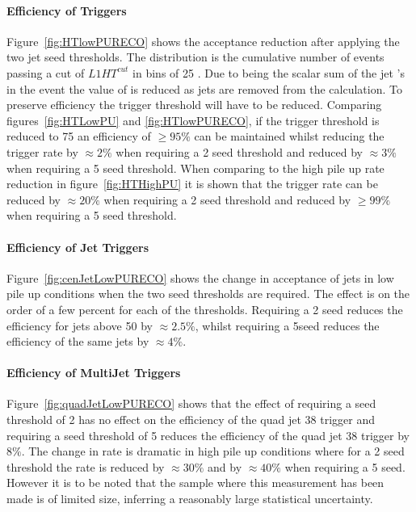 \paragraph{Efficiency of \HT Triggers} %
\label{par:Efficneicy of HT triggers}
Figure~\ref{fig:HTlowPURECO} shows the acceptance reduction after applying the 
two jet seed thresholds. The distribution is the cumulative number of events 
passing a cut of $L1 HT^{cut}$ in bins of 25 \GeV. Due to \HT being the scalar 
sum of the jet \PT's in the event the value of \Lone \HT is reduced as jets are 
removed from the calculation. To preserve efficiency the \Lone trigger 
threshold will have to be reduced. Comparing figures~\ref{fig:HTLowPU} and 
\ref{fig:HTlowPURECO}, if the trigger threshold is reduced to 75 \GeV an 
efficiency of $\geq 95\%$ can be maintained whilst reducing the trigger rate by 
$\approx 2\%$ when requiring a 2 \GeV seed threshold and reduced by $\approx 
3\%$ when requiring a 5 \GeV seed threshold. When comparing to the high pile up 
rate reduction in figure~\ref{fig:HTHighPU} it is shown that the trigger rate 
can be reduced by $\approx 20\%$ when requiring a 2 \GeV seed threshold and
reduced by $\geq 99\%$ when requiring a 5 \GeV seed threshold.


\paragraph{Efficiency of Jet Triggers} %
\label{par:Efficiency of Jet Triggers}
Figure~\ref{fig:cenJetLowPURECO} shows the change in acceptance of jets in low 
pile up conditions when the two seed thresholds are required. The effect is on 
the order of a few percent for each of the thresholds. Requiring a 2 \GeV seed 
reduces the efficiency for jets above 50 \GeV by $\approx 2.5\%$, whilst 
requiring a 5\GeV seed reduces the efficiency of the same jets by $\approx 4\%$.

\paragraph{Efficiency of MultiJet Triggers} %
\label{par:Efficiency of MultiJet Triggers}
Figure~\ref{fig:quadJetLowPURECO} shows that the effect of requiring a seed 
threshold of 2 \GeV has no effect on the efficiency of the quad jet 38 \GeV 
trigger and requiring a seed threshold of 5 \GeV reduces the efficiency of the 
quad jet 38 trigger by $8\%$. The change in rate is dramatic in high pile up 
conditions where for a 2 \GeV seed threshold the rate is reduced by 
$\approx 30\%$ and by $\approx 40\%$ when requiring a 5 \GeV seed.
However it is to be noted that the sample where this measurement has been made 
is of limited size, inferring a reasonably large statistical uncertainty. 


